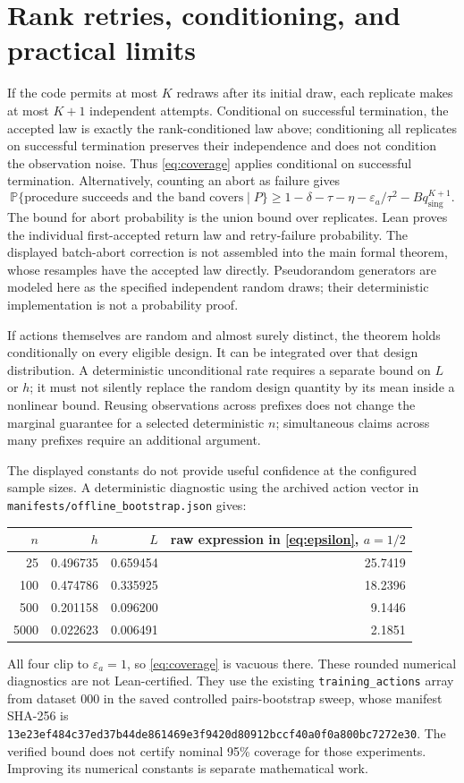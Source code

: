 \documentclass[11pt]{article}
\newcommand{\Prob}{\mathbb P}
\begin{document}
\section{Rank retries, conditioning, and practical limits}

If the code permits at most $K$ redraws after its initial draw, each
replicate makes at most $K+1$ independent attempts. Conditional on successful
termination, the accepted law is exactly the rank-conditioned law above;
conditioning all replicates on successful termination preserves their
independence and does not condition the observation noise. Thus
\eqref{eq:coverage} applies conditional on successful termination.
Alternatively, counting an abort as failure gives
\[
 \Prob\{\text{procedure succeeds and the band covers}\mid P\}
 \ge1-\delta-\tau-\eta-\varepsilon_a/\tau^2
                      -Bq_{\mathrm{sing}}^{K+1}.
\]
The bound for abort probability is the union bound over replicates.
Lean proves the individual first-accepted return law and retry-failure
probability. The displayed batch-abort correction is not assembled into
the main formal theorem, whose resamples have the accepted law directly.
Pseudorandom generators are modeled here as the specified independent random
draws; their deterministic implementation is not a probability proof.

If actions themselves are random and almost surely distinct, the theorem
holds conditionally on every eligible design. It can be integrated over that
design distribution. A deterministic unconditional rate requires a separate
bound on $L$ or $h$; it must not silently replace the random design quantity
by its mean inside a nonlinear bound. Reusing observations across prefixes
does not change the marginal guarantee for a selected deterministic $n$;
simultaneous claims across many prefixes require an additional argument.

The displayed constants do not provide useful confidence at the configured
sample sizes. A deterministic diagnostic using the archived action vector
in \texttt{manifests/offline\_bootstrap.json} gives:
\begin{center}
\begin{tabular}{r r r r}
\hline
$n$ & $h$ & $L$ & raw expression in \eqref{eq:epsilon}, $a=1/2$\\
\hline
25 & 0.496735 & 0.659454 & 25.7419\\
100 & 0.474786 & 0.335925 & 18.2396\\
500 & 0.201158 & 0.096200 & 9.1446\\
5000 & 0.022623 & 0.006491 & 2.1851\\
\hline
\end{tabular}
\end{center}
All four clip to $\varepsilon_a=1$, so \eqref{eq:coverage} is vacuous there.
These rounded numerical diagnostics are not Lean-certified. They use the
existing \texttt{training\_actions} array from dataset 000 in the saved
controlled pairs-bootstrap sweep, whose manifest SHA-256 is
\texttt{13e23ef484c37ed37b44de861469e3f9420d80912bccf40a0f0a800bc7272e30}.
The verified bound does not certify nominal 95\% coverage for those
experiments. Improving its numerical constants is separate mathematical work.
\end{document}
